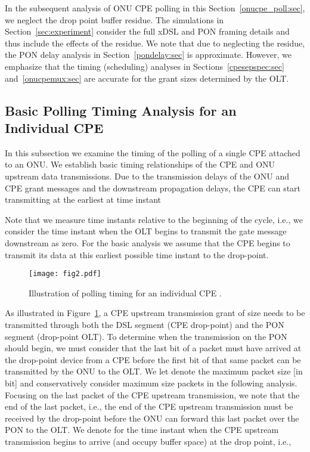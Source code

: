 \documentclass[pdftex,journal]{IEEEtran}
\begin{document}
In the subsequent analysis of ONU CPE polling in this
Section~\ref{onucpe_poll:sec}, we neglect the drop point buffer residue. The
simulations in Section~\ref{sec:experiment} consider the full xDSL
and PON framing details and thus include the effects of the residue.
We note that due to neglecting the residue,
the PON delay analysis in Section~\ref{pondelay:sec} is approximate.
However, we emphasize that the timing (scheduling) analyses in
Sections~\ref{cpesepspec:sec} and~\ref{onucpemux:sec} are accurate
for the grant sizes determined by the OLT.


\subsection{Basic Polling Timing Analysis for an Individual CPE}
\label{basicindcpe:sec}
In this subsection we examine the timing of the polling of a single
CPE  attached to an ONU. We establish basic timing relationships
of the CPE and ONU upstream data transmissions.
Due to the transmission delays of the ONU and CPE grant messages
and the downstream propagation delays, the CPE can start transmitting
at the earliest at time instant

Note that we measure time instants relative to the beginning of the
cycle, i.e., we consider the time instant when the OLT begins to transmit
the gate message downstream as zero.
For the basic analysis we assume that the CPE begins to transmit its
data at this earliest possible time instant  to the
drop-point.

\begin{figure}[t]
\centering
\texttt{[image: fig2.pdf]}
\caption{Illustration of polling timing for an individual CPE .}
\label{fig:onecpepolltime}
\end{figure}
As illustrated in Figure~\ref{fig:onecpepolltime}, a CPE upstream
transmission grant of size  needs to be transmitted through
both the DSL segment (CPE  drop-point) and the PON segment
(drop-point  OLT). To determine when the transmission on the
PON should begin, we must consider that the last bit of a packet
must have arrived at the drop-point device from a CPE before the
first bit of that same packet can be transmitted by the ONU to the
OLT. We let  denote the maximum packet size [in bit] and
conservatively consider maximum size packets in the following
analysis. Focusing on the last packet of the CPE upstream
transmission, we note that the end of the last packet, i.e., the end
of the CPE upstream transmission must be received by the drop-point
before the ONU can forward this last packet over the PON to the OLT.
We denote  for the time instant when the CPE upstream
transmission begins to arrive (and occupy buffer space) at the drop
point, i.e.,
\end{document}
